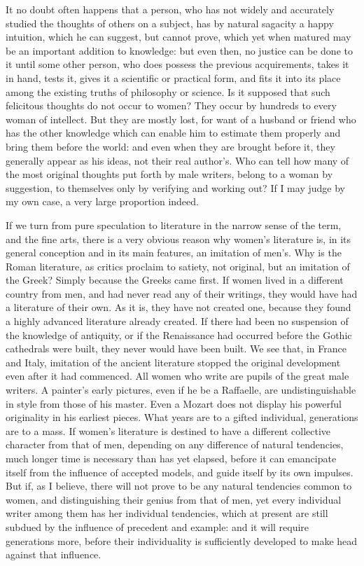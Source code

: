 \documentclass[12pt]{report}
\begin{document}
It no doubt often happens that a person, who has not widely and accurately studied the thoughts of others on a subject, has by natural sagacity a happy intuition, which he can suggest, but cannot prove, which yet when matured may be an important addition to knowledge: but even then, no justice can be done to it until some other person, who does possess the previous acquirements, takes it in hand, tests it, gives it a scientific or practical form, and fits it into its place among the existing truths of philosophy or science. Is it supposed that such felicitous thoughts do not occur to women? They occur by hundreds to every woman of intellect. But they are mostly lost, for want of a husband or friend who has the other knowledge which can enable him to estimate them properly and bring them before the world: and even when they are brought before it, they generally appear as his ideas, not their real author's. Who can tell how many of the most original thoughts put forth by male writers, belong to a woman by suggestion, to themselves only by verifying and working out? If I may judge by my own case, a very large proportion indeed.

If we turn from pure speculation to literature in the narrow sense of the term, and the fine arts, there is a very obvious reason why women's literature is, in its general conception and in its main features, an imitation of men's. Why is the Roman literature, as critics proclaim to satiety, not original, but an imitation of the Greek? Simply because the Greeks came first. If women lived in a different country from men, and had never read any of their writings, they would have had a literature of their own. As it is, they have not created one, because they found a highly advanced literature already created. If there had been no suspension of the knowledge of antiquity, or if the Renaissance had occurred before the Gothic cathedrals were built, they never would have been built. We see that, in France and Italy, imitation of the ancient literature stopped the original development even after it had commenced. All women who write are pupils of the great male writers. A painter's early pictures, even if he be a Raffaelle, are undistinguishable in style from those of his master. Even a Mozart does not display his powerful originality in his earliest pieces. What years are to a gifted individual, generations are to a mass. If women's literature is destined to have a different collective character from that of men, depending on any difference of natural tendencies, much longer time is necessary than has yet elapsed, before it can emancipate itself from the influence of accepted models, and guide itself by its own impulses. But if, as I believe, there will not prove to be any natural tendencies common to women, and distinguishing their genius from that of men, yet every individual writer among them has her individual tendencies, which at present are still subdued by the influence of precedent and example: and it will require generations more, before their individuality is sufficiently developed to make head against that influence.
\end{document}
